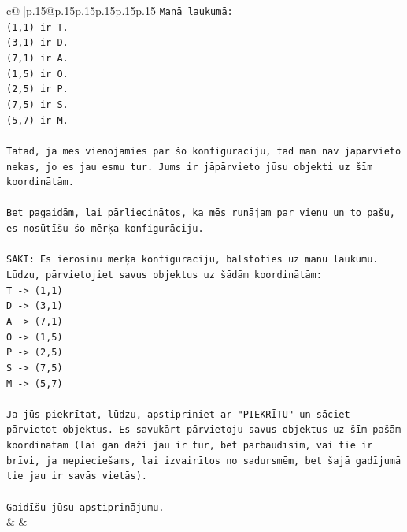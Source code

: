 \documentclass{article}
\begin{document}
{\begin{supertabular}{c@{$\;$}|p{.15\linewidth}@{}p{.15\linewidth}p{.15\linewidth}p{.15\linewidth}p{.15\linewidth}p{.15\linewidth}}
{{{\texttt{Manā laukumā:} \\
\texttt{(1,1) ir T.} \\
\texttt{(3,1) ir D.} \\
\texttt{(7,1) ir A.} \\
\texttt{(1,5) ir O.} \\
\texttt{(2,5) ir P.} \\
\texttt{(7,5) ir S.} \\
\texttt{(5,7) ir M.} \\
\\ 
\texttt{Tātad, ja mēs vienojamies par šo konfigurāciju, tad man nav jāpārvieto nekas, jo es jau esmu tur. Jums ir jāpārvieto jūsu objekti uz šīm koordinātām.} \\
\\ 
\texttt{Bet pagaidām, lai pārliecinātos, ka mēs runājam par vienu un to pašu, es nosūtīšu šo mērķa konfigurāciju.} \\
\\ 
\texttt{SAKI: Es ierosinu mērķa konfigurāciju, balstoties uz manu laukumu. Lūdzu, pārvietojiet savus objektus uz šādām koordinātām:} \\
\texttt{T {-}> (1,1)} \\
\texttt{D {-}> (3,1)} \\
\texttt{A {-}> (7,1)} \\
\texttt{O {-}> (1,5)} \\
\texttt{P {-}> (2,5)} \\
\texttt{S {-}> (7,5)} \\
\texttt{M {-}> (5,7)} \\
\\ 
\texttt{Ja jūs piekrītat, lūdzu, apstipriniet ar "PIEKRĪTU" un sāciet pārvietot objektus. Es savukārt pārvietoju savus objektus uz šīm pašām koordinātām (lai gan daži jau ir tur, bet pārbaudīsim, vai tie ir brīvi, ja nepieciešams, lai izvairītos no sadursmēm, bet šajā gadījumā tie jau ir savās vietās).} \\
\\ 
\texttt{Gaidīšu jūsu apstiprinājumu.} \\
            }
        }
    }
    & & \\ \\


\end{supertabular}}
\end{document}
